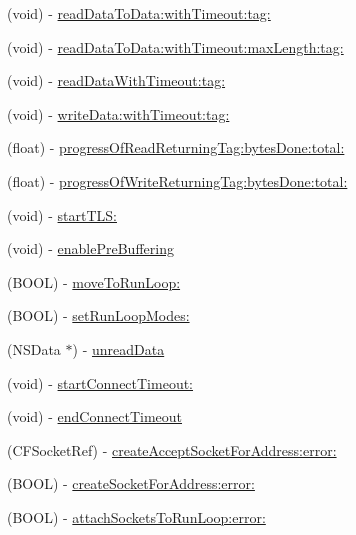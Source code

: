 \begin{DoxyCompactItemize}
\item 
(void) -\/ \hyperlink{interface_async_t_c_p_socket_a3a92e46de7766b3ac649f3d68d370599}{readDataToData:withTimeout:tag:}
\item 
(void) -\/ \hyperlink{interface_async_t_c_p_socket_a443ca87e6601022dcbc4d711e96dae95}{readDataToData:withTimeout:maxLength:tag:}
\item 
(void) -\/ \hyperlink{interface_async_t_c_p_socket_a58e63ca19338d5e052ad36e2e64ec585}{readDataWithTimeout:tag:}
\item 
(void) -\/ \hyperlink{interface_async_t_c_p_socket_a7f85c2e3c19bbe013c180b4668a28fc2}{writeData:withTimeout:tag:}
\item 
(float) -\/ \hyperlink{interface_async_t_c_p_socket_ab0b0ac0a1e46b2d05e094a1fc3e45ae7}{progressOfReadReturningTag:bytesDone:total:}
\item 
(float) -\/ \hyperlink{interface_async_t_c_p_socket_a38e3791947d9f10c2fc68f20e1a4d6c2}{progressOfWriteReturningTag:bytesDone:total:}
\item 
(void) -\/ \hyperlink{interface_async_t_c_p_socket_aec4d670add3f78c669277990d7b48056}{startTLS:}
\item 
(void) -\/ \hyperlink{interface_async_t_c_p_socket_aea1515621e1c285b7c49a8b212b978ce}{enablePreBuffering}
\item 
(BOOL) -\/ \hyperlink{interface_async_t_c_p_socket_a111317eafc9694b30edb4c36f513aa07}{moveToRunLoop:}
\item 
(BOOL) -\/ \hyperlink{interface_async_t_c_p_socket_aa6f2d16021ad8de163e5299f8497384e}{setRunLoopModes:}
\item 
(NSData $\ast$) -\/ \hyperlink{interface_async_t_c_p_socket_a7496a06a6ae2045ed442563d55bb2654}{unreadData}
\item 
(void) -\/ \hyperlink{interface_async_t_c_p_socket_a6a35d03945525a87faa9428bfd284fb8}{startConnectTimeout:}
\item 
(void) -\/ \hyperlink{interface_async_t_c_p_socket_a26caa9d94af387148d3a2ddf0612d9d7}{endConnectTimeout}
\item 
(CFSocketRef) -\/ \hyperlink{interface_async_t_c_p_socket_af9459620a9d7e1cf4503f8995ac905df}{createAcceptSocketForAddress:error:}
\item 
(BOOL) -\/ \hyperlink{interface_async_t_c_p_socket_ade0a31c61f419a44060e407bda52b93c}{createSocketForAddress:error:}
\item 
(BOOL) -\/ \hyperlink{interface_async_t_c_p_socket_aa14d12a24544fdf1ed5879557f1087a6}{attachSocketsToRunLoop:error:}
\item 

\end{DoxyCompactItemize}
